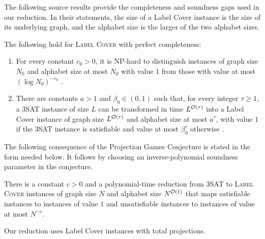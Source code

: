 The following source results provide the completeness and soundness gaps used in our reduction. In their statements, the size of a Label Cover instance is the size of its underlying graph, and the alphabet size is the larger of the two alphabet sizes.

\begin{theorem}\label{thm:label-cover-source-hardness}
    The following hold for \textup{\textsc{Label Cover}} with perfect completeness:
    \begin{enumerate}
        \item\label{item:label-cover-source-polylog} For every constant $c_0>0$, it is $\mathrm{NP}$-hard to distinguish instances of graph size $N_0$ and alphabet size at most $N_0$ with value $1$ from those with value at most $(\log N_0)^{-c_0}$ \cite[Corollary~1.4]{AnalyticalApproachToParallelRepetition}.
        \item\label{item:label-cover-source-repetition} There are constants $a>1$ and $\beta_0\in(0,1)$ such that, for every integer $\tau\geq1$, a 3SAT instance of size $L$ can be transformed in time $L^{\mathcal{O}(\tau)}$ into a Label Cover instance of graph size $L^{\mathcal{O}(\tau)}$ and alphabet size at most $a^\tau$, with value $1$ if the 3SAT instance is satisfiable and value at most $\beta_0^\tau$ otherwise \cite[Theorem~6.2]{AnalyticalApproachToParallelRepetition}.
    \end{enumerate}
\end{theorem}

The following consequence of the Projection Games Conjecture is stated in the form needed below. It follows by choosing an inverse-polynomial soundness parameter in the conjecture.
\begin{conjecture}\label{conj:label-cover-source-pgc}
    There is a constant $c>0$ and a polynomial-time reduction from 3SAT to \textup{\textsc{Label Cover}} instances of graph size $N$ and alphabet size $N^{\mathcal{O}(1)}$ that maps satisfiable instances to instances of value $1$ and unsatisfiable instances to instances of value at most $N^{-c}$.
\end{conjecture}

Our reduction uses Label Cover instances with total projections.

